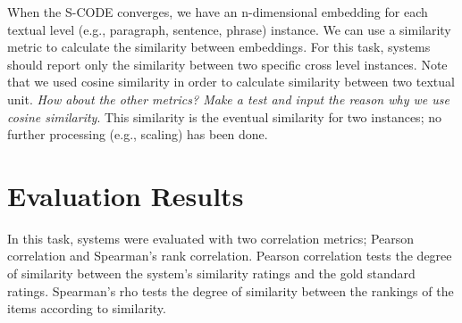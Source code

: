 \documentclass[11pt]{article}
\begin{document}
When the S-CODE converges, we have an n-dimensional embedding for each textual level (e.g., paragraph, sentence, phrase) instance. We can use a similarity metric to calculate 
the similarity between embeddings. For this task, systems should report only the similarity between two specific cross level instances. Note that we used cosine similarity in order to calculate similarity between two textual unit. \emph{How about the other metrics? Make a test and input the reason why we use cosine similarity}. This similarity is the eventual similarity for two instances; no further processing (e.g., scaling) has been done.





\section{Evaluation Results}
\label{evaluation}

In this task, systems were evaluated with two correlation metrics; Pearson correlation and Spearman's rank correlation.  Pearson correlation tests the degree of similarity between the system's similarity ratings and the gold standard ratings.  Spearman's rho tests the degree of similarity between the rankings of the items according to similarity.
\end{document}
